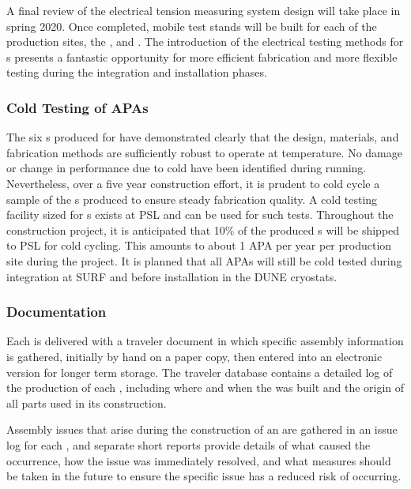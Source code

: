 A final review of the electrical tension measuring system design will take place in spring 2020. Once completed, mobile  test stands will be built for each of the  production sites, the , and .  The introduction of the electrical testing methods for s presents a fantastic opportunity for more efficient  fabrication and more flexible testing during the integration and installation phases.    


\subsubsection{Cold Testing of APAs}
\label{sec:fdsp-apa-prod-coldtest}

The six s produced for  have demonstrated clearly that the  design, materials, and fabrication methods are sufficiently robust to operate at  temperature.  No damage or change in performance due to cold have been identified during  running.  Nevertheless, over a five year construction effort, it is prudent to cold cycle a sample of the s produced to ensure steady fabrication quality.  A cold testing facility sized for  s exists at PSL and can be used for such tests. Throughout the construction project, it is anticipated that 10\% of the produced s will be shipped to PSL for cold cycling.  This amounts to about 1 APA per year per production site during the project.  It is planned that all APAs will still be cold tested during integration at SURF and before installation in the DUNE cryostats.      


\subsubsection{Documentation} 
\label{sec:fdsp-apa-prod-doc}

Each  is delivered with a traveler document in which specific assembly information is gathered, initially by hand on a paper copy, then entered into an electronic version for longer term storage.  The traveler database contains a detailed log of the production of each , including where and when the  was built and the origin of all parts used in its construction. 

Assembly issues that arise during the construction of an  are gathered in an issue log for each , and separate short reports provide details of what caused the occurrence, how the issue was immediately resolved, and what measures should be taken in the future to ensure the specific issue has a reduced risk of occurring.  
